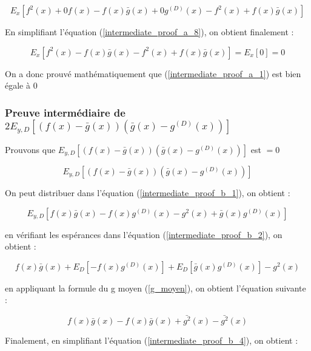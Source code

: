 \documentclass[a4paper]{article}
\begin{document}
\begin{equation}
\label{intermediate_proof_a_8}
E_x[f^2(x) + 0 f(x) - f(x)\bar{g}(x) + 0 g^{(D)}(x) - f^2(x) + f(x)\bar{g}(x)]
\end{equation}

En simplifiant l'équation (\ref{intermediate_proof_a_8}), on obtient finalement :

\begin{equation}
\label{intermediate_proof_a_9}
E_x[f^2(x) - f(x)\bar{g}(x) - f^2(x) + f(x)\bar{g}(x)] = E_x[0] = 0
\end{equation}

On a donc prouvé mathématiquement que (\ref{intermediate_proof_a_1}) est bien égale à 0
\newpage

\subsubsection{Preuve intermédiaire de $2E_{y,D} [(f(x)-\bar{g}(x)) (\bar{g}(x) - g^{(D)}(x)) ]$}
\label{intermediate_proof_b_subsection}
Prouvons que $E_{y,D} [(f(x)-\bar{g}(x)) (\bar{g}(x) - g^{(D)}(x)) ]$ est $= 0$ 

\begin{equation}
	\label{intermediate_proof_b_1}
	E_{y,D} [(f(x)-\bar{g}(x)) (\bar{g}(x) - g^{(D)}(x)) ]
\end{equation}

On peut distribuer dans l'équation (\ref{intermediate_proof_b_1}), on obtient :

\begin{equation}
		\label{intermediate_proof_b_2}
	E_{y,D} [ f(x)\bar{g}(x) - f(x)g^{(D)}(x) -g^2(x) + \bar{g}(x)g^{(D)}(x)]
\end{equation}

en vérifiant les espérances dans l'équation (\ref{intermediate_proof_b_2}), on obtient :

\begin{equation}
	\label{intermediate_proof_b_3}
	f(x)\bar{g}(x) + E_{D} [- f(x)g^{(D)}(x)] + E_{D} [ \bar{g}(x)g^{(D)}(x)] -g^2(x)
\end{equation}

en appliquant la formule du g moyen (\ref{g_moyen}), on obtient l'équation suivante :

\begin{equation}
	\label{intermediate_proof_b_4}
	f(x)\bar{g}(x) - f(x)\bar{g}(x) + \bar{g^2}(x) -\bar{g^2}(x)
\end{equation}

Finalement, en simplifiant l'équation (\ref{intermediate_proof_b_4}), on obtient :
\end{document}
